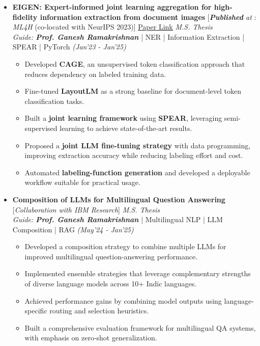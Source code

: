 \documentclass[a4paper,10pt]{article}
\begin{document}
\begin{itemize}
\item \textbf{EIGEN: Expert-informed joint learning aggregation for high-fidelity information extraction from document images} \hspace{0.5cm} [\textit{\textbf{Published} at} : \textit{ML4H} (co-located with NeurIPS 2023)] \href{https://proceedings.mlr.press/v225/singh23a.html}{\underline{Paper Link}} \hfill \emph{M.S. Thesis}\\
\emph{Guide: \textbf{Prof. Ganesh Ramakrishnan}} | NER | Information Extraction | SPEAR | PyTorch \hfill \emph{(Jan'23 - Jan'25)}\\[-0.5cm]
\begin{itemize}[noitemsep,nolistsep]
    \item Developed \textbf{CAGE}, an unsupervised token classification approach that reduces dependency on labeled training data.
    \item Fine-tuned \textbf{LayoutLM} as a strong baseline for document-level token classification tasks.
    \item Built a \textbf{joint learning framework} using \textbf{SPEAR}, leveraging semi-supervised learning to achieve state-of-the-art results.
    \item Proposed a \textbf{joint LLM fine-tuning strategy} with data programming, improving extraction accuracy while reducing labeling effort and cost.
    \item Automated \textbf{labeling-function generation} and developed a deployable workflow suitable for practical usage.
\end{itemize}
\end{itemize}

\begin{itemize}
\item \textbf{Composition of LLMs for Multilingual Question Answering} \hspace{0.5cm} [\textit{Collaboration with IBM Research}] \hfill \emph{M.S. Thesis}\\
\emph{Guide: \textbf{Prof. Ganesh Ramakrishnan}} | Multilingual NLP | LLM Composition | RAG \hfill \emph{(May'24 - Jan'25)}\\[-0.5cm]
\begin{itemize}[noitemsep,nolistsep]
    \item Developed a composition strategy to combine multiple LLMs for improved multilingual question-answering performance.
    \item Implemented ensemble strategies that leverage complementary strengths of diverse language models across 10+ Indic languages.
    \item Achieved performance gains by combining model outputs using language-specific routing and selection heuristics.
    \item Built a comprehensive evaluation framework for multilingual QA systems, with emphasis on zero-shot generalization.
\end{itemize}
\end{itemize}
\end{document}
